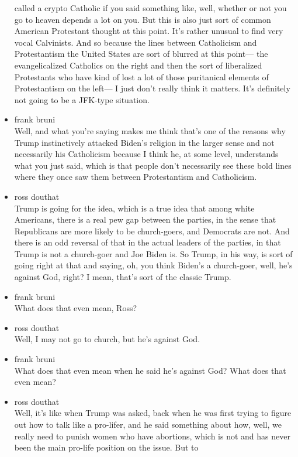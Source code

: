 \begin{itemize}
  called a crypto Catholic if you said something like, well, whether or
  not you go to heaven depends a lot on you. But this is also just sort
  of common American Protestant thought at this point. It's rather
  unusual to find very vocal Calvinists. And so because the lines
  between Catholicism and Protestantism the United States are sort of
  blurred at this point--- the evangelicalized Catholics on the right
  and then the sort of liberalized Protestants who have kind of lost a
  lot of those puritanical elements of Protestantism on the left--- I
  just don't really think it matters. It's definitely not going to be a
  JFK-type situation.
\item
  frank bruni\\
  Well, and what you're saying makes me think that's one of the reasons
  why Trump instinctively attacked Biden's religion in the larger sense
  and not necessarily his Catholicism because I think he, at some level,
  understands what you just said, which is that people don't necessarily
  see these bold lines where they once saw them between Protestantism
  and Catholicism.
\item
  ross douthat\\
  Trump is going for the idea, which is a true idea that among white
  Americans, there is a real pew gap between the parties, in the sense
  that Republicans are more likely to be church-goers, and Democrats are
  not. And there is an odd reversal of that in the actual leaders of the
  parties, in that Trump is not a church-goer and Joe Biden is. So
  Trump, in his way, is sort of going right at that and saying, oh, you
  think Biden's a church-goer, well, he's against God, right? I mean,
  that's sort of the classic Trump.
\item
  frank bruni\\
  What does that even mean, Ross?
\item
  ross douthat\\
  Well, I may not go to church, but he's against God.
\item
  frank bruni\\
  What does that even mean when he said he's against God? What does that
  even mean?
\item
  ross douthat\\
  Well, it's like when Trump was asked, back when he was first trying to
  figure out how to talk like a pro-lifer, and he said something about
  how, well, we really need to punish women who have abortions, which is
  not and has never been the main pro-life position on the issue. But to

\end{itemize}
